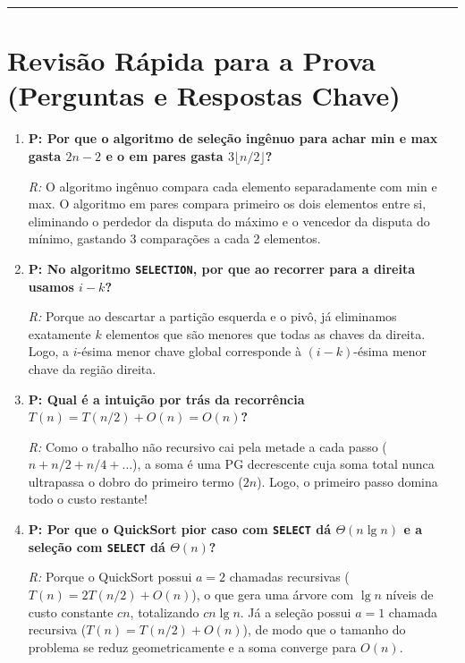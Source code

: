 \documentclass[11pt,a4paper]{article}
\begin{document}
\vspace{10pt}
\hrule
\vspace{6pt}

\section*{Revisão Rápida para a Prova (Perguntas e Respostas Chave)}

\begin{enumerate}
    \item \textbf{P: Por que o algoritmo de seleção ingênuo para achar min e max gasta $2n-2$ e o em pares gasta $3\lfloor n/2 \rfloor$?}
    
    \textit{R:} O algoritmo ingênuo compara cada elemento separadamente com min e max. O algoritmo em pares compara primeiro os dois elementos entre si, eliminando o perdedor da disputa do máximo e o vencedor da disputa do mínimo, gastando 3 comparações a cada 2 elementos.

    \item \textbf{P: No algoritmo \texttt{SELECTION}, por que ao recorrer para a direita usamos $i - k$?}
    
    \textit{R:} Porque ao descartar a partição esquerda e o pivô, já eliminamos exatamente $k$ elementos que são menores que todas as chaves da direita. Logo, a $i$-ésima menor chave global corresponde à $(i - k)$-ésima menor chave da região direita.

    \item \textbf{P: Qual é a intuição por trás da recorrência $T(n) = T(n/2) + O(n) = O(n)$?}
    
    \textit{R:} Como o trabalho não recursivo cai pela metade a cada passo ($n + n/2 + n/4 + \dots$), a soma é uma PG decrescente cuja soma total nunca ultrapassa o dobro do primeiro termo ($2n$). Logo, o primeiro passo domina todo o custo restante!

    \item \textbf{P: Por que o QuickSort pior caso com \texttt{SELECT} dá $\Theta(n \lg n)$ e a seleção com \texttt{SELECT} dá $\Theta(n)$?}
    
    \textit{R:} Porque o QuickSort possui $a = 2$ chamadas recursivas ($T(n) = 2T(n/2) + O(n)$), o que gera uma árvore com $\lg n$ níveis de custo constante $cn$, totalizando $cn \lg n$. Já a seleção possui $a = 1$ chamada recursiva ($T(n) = T(n/2) + O(n)$), de modo que o tamanho do problema se reduz geometricamente e a soma converge para $O(n)$.
\end{enumerate}
\end{document}
